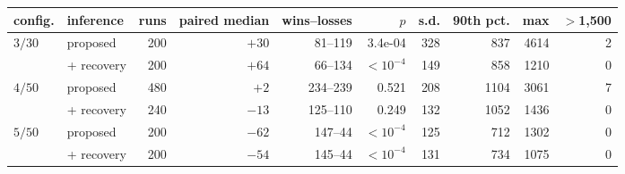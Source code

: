 \begin{tabular}{llrrrrrrrr}
\toprule
config. & inference & runs & paired median & wins--losses & $p$ & s.d. & 90th pct. & max & $>$1{,}500 \\
\midrule
$3/30$ & proposed & 200 & $+30$ & 81--119 & 3.4e-04 & 328 & 837 & 4614 & 2 \\
 & + recovery & 200 & $+64$ & 66--134 & $<10^{-4}$ & 149 & 858 & 1210 & 0 \\
\addlinespace
$4/50$ & proposed & 480 & $+2$ & 234--239 & 0.521 & 208 & 1104 & 3061 & 7 \\
 & + recovery & 240 & $-13$ & 125--110 & 0.249 & 132 & 1052 & 1436 & 0 \\
\addlinespace
$5/50$ & proposed & 200 & $-62$ & 147--44 & $<10^{-4}$ & 125 & 712 & 1302 & 0 \\
 & + recovery & 200 & $-54$ & 145--44 & $<10^{-4}$ & 131 & 734 & 1075 & 0 \\
\bottomrule
\end{tabular}%
